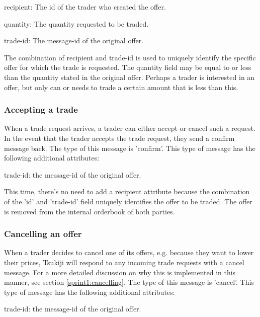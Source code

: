 \begin{myitemize}
\item recipient: The id of the trader who created the offer.
\item quantity: The quantity requested to be traded.
\item trade-id: The message-id of the original offer.
\end{myitemize}

The combination of recipient and trade-id is used to uniquely identify the specific offer for which the trade is requested.
The quantity field may be equal to or less than the quantity stated in the original offer.
Perhaps a trader is interested in an offer, but only can or needs to trade a certain amount that is less than this.

\subsubsection{Accepting a trade}

When a trade request arrives, a trader can either accept or cancel such a request.
In the event that the trader accepts the trade request, they send a confirm message back.
The type of this message is 'confirm'.
This type of message has the following additional attributes:

\begin{myitemize}
\item trade-id: the message-id of the original offer.
\end{myitemize}

This time, there's no need to add a recipient attribute because the combination of the 'id' and 'trade-id' field uniquely identifies the offer to be traded.
The offer is removed from the internal orderbook of both parties.

\subsubsection{Cancelling an offer}

When a trader decides to cancel one of its offers, e.g. because they want to lower their prices, Tsukiji will respond to any incoming trade requests with a cancel message.
For a more detailed discussion on why this is implemented in this manner, see section \ref{sprint1:cancelling}.
The type of this message is 'cancel'.
This type of message has the following additional attributes:

\begin{myitemize}
\item trade-id: the message-id of the original offer.
\end{myitemize}

